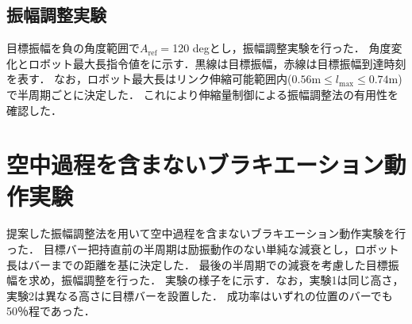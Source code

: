 \begin{small}
\subsection{振幅調整実験}
目標振幅を負の角度範囲で$A_{\mathrm{ref}}=$120 degとし，振幅調整実験を行った．
角度変化とロボット最大長指令値をに示す．黒線は目標振幅，赤線は目標振幅到達時刻を表す．
なお，ロボット最大長はリンク伸縮可能範囲内($0.56\mathrm{m}\le l_{\mathrm{max}} \le 0.74\mathrm{m}$)で半周期ごとに決定した．
これにより伸縮量制御による振幅調整法の有用性を確認した．

\section{空中過程を含まないブラキエーション動作実験}
提案した振幅調整法を用いて空中過程を含まないブラキエーション動作実験を行った．
目標バー把持直前の半周期は励振動作のない単純な減衰とし，ロボット長はバーまでの距離を基に決定した．
最後の半周期での減衰を考慮した目標振幅を求め，振幅調整を行った．
実験の様子をに示す．なお，実験1は同じ高さ，実験2は異なる高さに目標バーを設置した．
成功率はいずれの位置のバーでも50％程であった．



\end{small}
